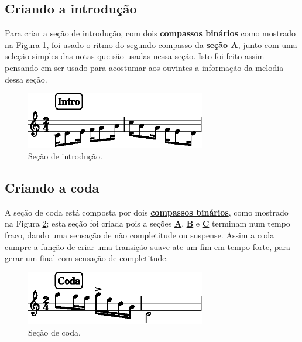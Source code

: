 \subsection{Criando a introdução}
Para criar a seção de introdução, 
com dois \hyperref[subsec:compassobinario]{\textbf{compassos binários}} como mostrado na Figura \ref{fig:section-intro},
foi usado o ritmo do segundo compasso da \hyperref[subsec:criandoa]{\textbf{seção A}},
junto com uma seleção simples das notas que são usadas nessa seção. 
Isto foi feito assim pensando em ser usado para acostumar aos ouvintes a informação da melodia dessa seção.
     \begin{figure}[H]
	     \centering
	     \includegraphics[width=0.7\textwidth]{chapters/cap-musica-topicos/section-intro-1.eps}
	     \caption{Seção de introdução.}
	     \label{fig:section-intro}
     \end{figure}

\subsection{Criando a coda}
A seção de coda está composta por dois \hyperref[subsec:compassobinario]{\textbf{compassos binários}}, 
como mostrado na Figura \ref{fig:section-coda};
esta seção foi criada pois a seções 
\hyperref[subsec:criandoa]{\textbf{A}},
\hyperref[subsec:criandob]{\textbf{B}} e
\hyperref[subsec:criandoc]{\textbf{C}}
terminam num tempo fraco, dando uma sensação de não completitude ou suspense.
Assim a coda cumpre a função de criar uma transição suave ate um fim em tempo forte,
para gerar um final com sensação de completitude.
     \begin{figure}[H]
	     \centering
	     \includegraphics[width=0.7\textwidth]{chapters/cap-musica-topicos/section-coda-1.eps}
	     \caption{Seção de coda.}
	     \label{fig:section-coda}
     \end{figure}

